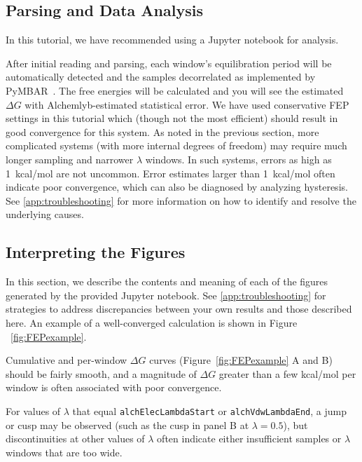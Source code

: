 \documentclass[9pt,tutorial]{Styling/livecoms}
\newcommand{\textInput}[1]{\texttt{#1}}
\begin{document}
\subsection{Parsing and Data Analysis}\label{app:Analysis}
In this tutorial, we have recommended using a Jupyter notebook for analysis. 

After initial reading and parsing, each window's equilibration period will be automatically detected and the samples decorrelated as implemented by PyMBAR~\cite{shirts2008statistically}. The free energies will be calculated and you will see the estimated $\Delta G$ with Alchemlyb-estimated statistical error. We have used conservative FEP settings in this tutorial which (though not the most efficient) should result in good convergence for this system. As noted in the previous section, more complicated systems (with more internal degrees of freedom) may require much longer sampling and narrower $\lambda$ windows. In such systems,  errors as high as 1~kcal/mol are not uncommon. Error estimates larger than 1~kcal/mol often indicate poor convergence, which can also be diagnosed by analyzing hysteresis. See \ref{app:troubleshooting} for more information on how to identify and resolve the underlying causes.

\subsection{Interpreting the Figures}\label{app:InterpretingFEP}
In this section, we describe the contents and meaning of each of the figures generated by the provided Jupyter notebook. See \ref{app:troubleshooting} for strategies to address discrepancies between your own results and those described here. An example of a well-converged calculation is shown in Figure ~\ref{fig:FEPexample}.

Cumulative and per-window $\Delta G$ curves (Figure~\ref{fig:FEPexample} A and B) should be fairly smooth, and a magnitude of $\Delta G$ greater than a few kcal/mol per window is often associated with poor convergence.

For values of $\lambda$ that equal \textInput{alchElecLambdaStart} or \textInput{alchVdwLambdaEnd}, a jump or cusp may be observed (such as the cusp in panel B at $\lambda = 0.5$), but discontinuities at other values of $\lambda$ often indicate either insufficient samples or $\lambda$ windows that are too wide.
\end{document}
